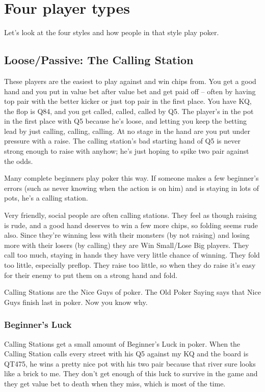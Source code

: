 \section{Four player types}

Let's look at the four styles and how people in that style play poker.

\subsection{Loose/Passive: The Calling Station}

These players are the easiest to play against and win chips from.
You get a good hand and you put in value bet after value bet and
get paid off -- often by having top pair with the better kicker or
just top pair in the first place. You have KQ, the flop is Q84, and
you get called, called, called by Q5. The player's in the pot in the
first place with Q5 because he's loose, and letting you keep the
betting lead by just calling, calling, calling. At no stage in
the hand are you put under pressure with a raise. The calling
station's bad starting hand of Q5 is never strong enough to raise with
anyhow; he's just hoping to spike two pair against the odds.

Many complete beginners play poker this way. If someone makes
a few beginner's errors (such as never knowing when the action
is on him) and is staying in lots of pots, he's a calling station.

Very friendly, social people are often calling stations.
They feel as though raising is rude, and a good hand deserves
to win a few more chips, so folding seems rude also. Since
they're winning less with their monsters (by not raising)
and losing more with their losers (by calling) they are
Win Small/Lose Big players. They call too much, staying
in hands they have very little chance of winning. They fold
too little, especially preflop. They raise too little, so when
they do raise it's easy for their enemy to put them on a strong hand
and fold.

Calling Stations are the Nice Guys of poker. The Old Poker Saying says
that Nice Guys finish last in poker. Now you know why.

\subsubsection{Beginner's Luck}

Calling Stations get a small amount of Beginner's Luck in poker.
When the Calling Station calls every street with his Q5 against my KQ
and the board is QT475, he wins a pretty nice pot with his two pair
because that river sure looks like a brick to me. They don't get
enough of this luck to survive in the game and they get value bet to
death when they miss, which is most of the time.


